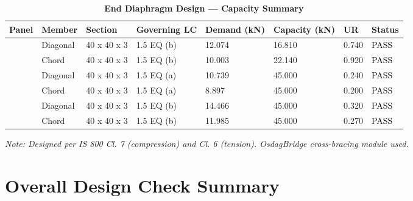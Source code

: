 \documentclass[12pt,a4paper]{report}
\numberwithin{table}{chapter}
\numberwithin{figure}{chapter}
\begin{document}
\vspace{1em}

\begin{longtable}{|C{2.0cm}|L{1.8cm}|C{2.2cm}|C{3.0cm}|C{1.8cm}|C{1.8cm}|C{1.2cm}|C{1.8cm}|}
\caption{\textbf{End Diaphragm Design --- Capacity Summary}}
\hline
\textbf{Panel} & \textbf{Member} & \textbf{Section} & \textbf{Governing LC} & \textbf{Demand (kN)} & \textbf{Capacity (kN)} & \textbf{UR} & \textbf{Status} \\[6pt]
\hline
{} & Diagonal & 40 x 40 x 3 & 1.5 EQ (b) & 12.074 & 16.810 & 0.740 & \textcolor{black}{PASS} \\[6pt]
 & Chord & 40 x 40 x 3 & 1.5 EQ (b) & 10.003 & 22.140 & 0.920 & \textcolor{black}{PASS} \\[6pt]
\hline
{} & Diagonal & 40 x 40 x 3 & 1.5 EQ (a) & 10.739 & 45.000 & 0.240 & \textcolor{black}{PASS} \\[6pt]
 & Chord & 40 x 40 x 3 & 1.5 EQ (a) & 8.897 & 45.000 & 0.200 & \textcolor{black}{PASS} \\[6pt]
\hline
{} & Diagonal & 40 x 40 x 3 & 1.5 EQ (b) & 14.466 & 45.000 & 0.320 & \textcolor{black}{PASS} \\[6pt]
 & Chord & 40 x 40 x 3 & 1.5 EQ (b) & 11.985 & 45.000 & 0.270 & \textcolor{black}{PASS} \\[6pt]
\hline
\end{longtable}
\noindent\textit{Note: Designed per IS 800 Cl. 7 (compression) and Cl. 6 (tension). OsdagBridge cross-bracing module used.}

\section{Overall Design Check Summary}
\label{sec:overall-summary}
\end{document}
